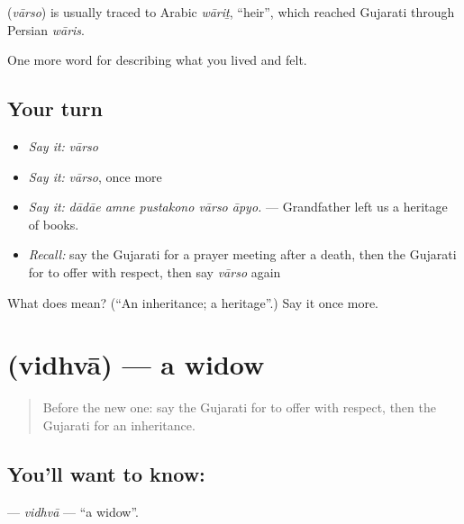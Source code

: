 \begin{cousinweb}
\textbf{} (\emph{vārso}) is usually traced to Arabic \emph{wāriṯ}, \textquotedblleft{}heir\textquotedblright{}, which reached Gujarati through Persian \emph{wāris}.
\end{cousinweb}

\begin{grammarlens}[title={What you've built}]
One more word for describing what you lived and felt.
\end{grammarlens}

\subsection*{Your turn}
\begin{itemize}
\raggedright
  \item \emph{Say it:} \emph{vārso}
  \item \emph{Say it:} \emph{vārso}, once more
  \item \emph{Say it:} \emph{dādāe amne pustakono vārso āpyo.} — Grandfather left us a heritage of books.
  \item \emph{Recall:} say the Gujarati for a prayer meeting after a death, then the Gujarati for to offer with respect, then say \emph{vārso} again
\end{itemize}

\begin{tcolorbox}[breakable,colback=teal!4,colframe=teal!35!black,title={Before you move on}]
What does  mean? (\textquotedblleft{}An inheritance; a heritage\textquotedblright{}.) Say it once more.
\end{tcolorbox}
\section[\texorpdfstring{\gu{વિધવા} (vidhvā)}{વિધવા (vidhvā)}]{ (vidhvā) — a widow}

\label{lesson:GU-C500-vidhva}



\begin{quote}
Before the new one: say the Gujarati for to offer with respect, then the Gujarati for an inheritance.
\end{quote}

\subsection*{You'll want to know: }
\textbf{} — \emph{vidhvā} — \textquotedblleft{}a widow\textquotedblright{}.

